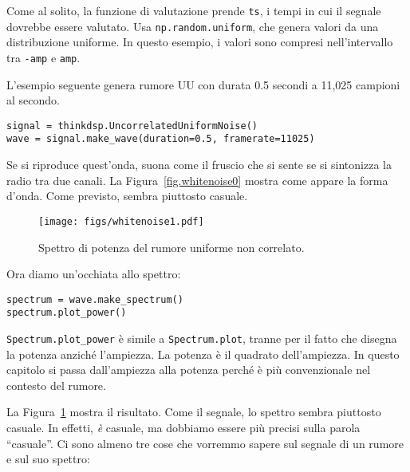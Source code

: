 \documentclass[12pt,a4paper]{book}
\begin{document}
Come al solito, la funzione di valutazione prende {\tt ts}, i tempi in cui il segnale dovrebbe essere valutato. Usa {\tt np.random.uniform}, che genera valori da una distribuzione uniforme. In questo esempio, i valori sono compresi nell'intervallo tra {\tt -amp} e {\tt amp}.

L'esempio seguente genera rumore UU con durata 0.5 secondi a 11,025 campioni al secondo.

\begin{verbatim} 
signal = thinkdsp.UncorrelatedUniformNoise()
wave = signal.make_wave(duration=0.5, framerate=11025)
 \end{verbatim} 

Se si riproduce quest'onda, suona come il fruscio che si sente se si sintonizza la radio tra due canali. La Figura~\ref{fig.whitenoise0} mostra come appare la forma d'onda. Come previsto, sembra piuttosto casuale.

\begin{figure} 

\centerline{\texttt{[image: figs/whitenoise1.pdf]}} \caption{Spettro di potenza del rumore uniforme non correlato.} \label{fig.whitenoise1} \end{figure} 

Ora diamo un'occhiata allo spettro:

\begin{verbatim} 
spectrum = wave.make_spectrum()
spectrum.plot_power()
 \end{verbatim} 

\verb"Spectrum.plot_power" è simile a \verb"Spectrum.plot", tranne per il fatto che disegna la potenza anziché l'ampiezza. La potenza è il quadrato dell'ampiezza. In questo capitolo si passa dall'ampiezza alla potenza perché è più convenzionale nel contesto del rumore.

La Figura~\ref{fig.whitenoise1} mostra il risultato. Come il segnale, lo spettro sembra piuttosto casuale. In effetti, {\em è} casuale, ma dobbiamo essere più precisi sulla parola ``casuale''. Ci sono almeno tre cose che vorremmo sapere sul segnale di un rumore e sul suo spettro:
\end{document}

